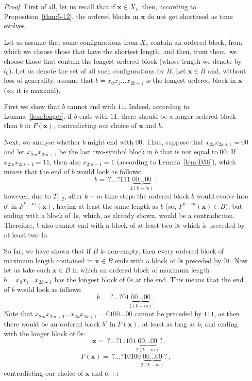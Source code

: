 \documentclass[10pt,a4paper]{amsart}
\newcommand{\bx}{\mathbf{x}}
\newcommand{\xconst}{X_{s}}
\begin{document}
\begin{proof}
First of all, let us recall that if $\bx\in\xconst$, then, according to Proposition~\ref{thm:5-12}, the ordered blocks in $\bx$ do not get shortened as time evolves.

Let us assume that some configurations from $\xconst$ contain an ordered block, from which we choose those that have the shortest length, and then, from them, we choose  those that contain the longest ordered block (whose length we denote by $l_0$). Let us denote the set of all such configurations by $B$. 
Let $\bx\in B$ and, without loss of generality, assume that $b=x_{0}x_1\ldots x_{2k+1}$ is the longest ordered block in $\bx$ (so, it is maximal). 

First we show that $b$ cannot end with $11$. 
Indeed, according to Lemma~\ref{lem:longer}, if $b$ ends with $11$, there should be a longer ordered block than $b$ in $F(\bx)$, contradicting our choice of $\bx$ and $b$.

Next, we analyse whether $b$ might end with $00$. Thus, suppose that $x_{2k}x_{2k+1}=00$ and let $x_{2m}x_{2m+1}$ be the last two-symbol block in $b$ that is not equal to $00$. If $x_{2m}x_{2m+1}=11$, then also  $x_{2m-1}=1$ (according to Lemma~\ref{lem:D56}), which means that the end of $b$ would look as follows: 
\[
b = \ ?\ldots?111\underbrace{00\ldots 00}_{2(k-m)}\ ;
\]
however, due to $T_{1,2}$, after $k-m$ time steps the ordered block $b$ would evolve into $b'$ in $F^{k-m}(\bx)$, having at least the same length as $b$ (so, $F^{k-m}(\bx)\in B$), but ending with a block of 1s, which, as already shown, would be a contradiction. Therefore, $b$ also cannot end with a block of at least two 0s which is preceded by at least two 1s.

So far, we have shown that if $B$ is non-empty, then every ordered block of maximum length contained in $\bx\in B$ ends with a block of 0s preceded by $01$. Now let us take such $\bx\in B$ in which an ordered block of maximum length $b=x_{0}x_1\ldots x_{2k+1}$ has the longest block of 0s at the end. This means that the end of $b$ would look as follows: 
\[
b=\ ?\ldots?01\underbrace{00\ldots 00}_{2(k-m)}\ .
\]
Note that $x_{2m}x_{2m+1}\ldots x_{2k}x_{2k+1}=0100\ldots 00$ cannot be preceded by $111$, as then there would be an ordered block $b'$ in $F(\bx)$, at least as long as $b$, and ending with the longer block of 0s:
\[
\phantom{ff}\bx=\ ?\ldots?11101\underbrace{00\ldots 00}_{2(k-m)}? \ , 
\]
\[
F(\bx)=\ ?\ldots?10100\underbrace{00\ldots 00}_{2(k-m)}? \ ,
\]
contradicting our choice of $\bx$ and $b$.


\end{proof}
\end{document}
